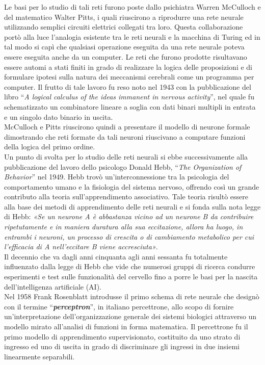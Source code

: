 \documentclass[12pt,a4paper,oneside]{book}
\begin{document}
		Le basi per lo studio di tali reti furono poste dallo psichiatra Warren McCulloch e del matematico Walter Pitts, i quali riuscirono a riprodurre una rete neurale utilizzando semplici circuiti elettrici collegati tra loro. Questa collaborazione portò alla luce l'analogia esistente tra le reti neurali e la macchina di Turing ed in tal modo si capì che qualsiasi operazione eseguita da una rete neurale poteva essere eseguita anche da un computer. Le reti che furono prodotte risultavano essere automi a stati finiti in grado di realizzare la logica delle proposizioni e di formulare ipotesi sulla natura dei meccanismi cerebrali come un programma per computer. Il frutto di tale lavoro fu reso noto nel 1943 con la pubblicazione del libro ``\emph{A logical calculus of the ideas immanent in nervous activity}'', nel quale fu schematizzato un combinatore lineare a soglia con dati binari multipli in entrata e un singolo dato binario in uscita.\\
	    McCulloch e Pitts riuscirono quindi a presentare il modello di neurone formale dimostrando che reti formate da tali neuroni riuscivano a computare funzioni della logica del primo ordine.\\
	    Un punto di svolta per lo studio delle reti neurali si ebbe successivamente alla pubblicazione del lavoro dello psicologo Donald Hebb, ``\emph{The Organization of Behavior}'' nel 1949. Hebb trovò un'interconnessione tra la psicologia del comportamento umano e la fisiologia del sistema nervoso, offrendo così un grande contributo alla teoria sull'apprendimento associativo. Tale teoria  risultò essere alla base dei metodi di apprendimento delle reti neurali e si fonda sulla nota legge di Hebb: \textit{«Se un neurone A è abbastanza vicino ad un neurone B da contribuire ripetutamente e in maniera duratura alla sua eccitazione, allora ha luogo, in entrambi i neuroni, un processo di crescita o di cambiamento metabolico per cui l'efficacia di A nell'eccitare B viene accresciuta»}.\\
	    Il decennio che va dagli anni cinquanta agli anni sessanta fu totalmente influenzato dalla legge di Hebb che vide che numerosi gruppi di ricerca condurre esperimenti e test sulle funzionalità del cervello fino a porre le basi per la nascita dell'intelligenza artificiale (AI).\\
	    Nel 1958 Frank Rosenblatt introdusse il primo schema di rete neurale che designò con il termine ``\textbf{\emph{perceptron}}'', in italiano percettrone, allo scopo di fornire un'interpretazione dell'organizzazione generale dei sistemi biologici attraverso un modello mirato all'analisi di funzioni in forma matematica. Il percettrone fu il primo modello di apprendimento supervisionato, costituito da uno strato di ingresso ed uno di uscita in grado di discriminare gli ingressi in due insiemi linearmente separabili.\\
\end{document}
